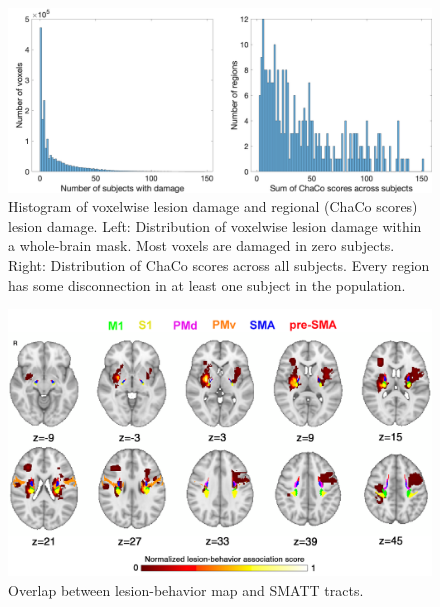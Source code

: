 \documentclass[10pt]{article}
\begin{document}
\begin{figure}[htp]
\centering
\includegraphics[width=1\linewidth]{figures/histogram_voxels_chaco.png}
\caption{Histogram of voxelwise lesion damage and regional (ChaCo scores) lesion damage. Left:  Distribution of voxelwise lesion damage within a whole-brain mask. Most voxels are damaged in zero subjects. Right: Distribution of ChaCo scores across all subjects. Every region has some disconnection in at least one subject in the population. }
\label{histogram_voxels_chaco}
\end{figure}


\begin{figure}[htp]
\centering
\includegraphics[width=1\linewidth]{figures/lbm_vs_smatt.png}
\caption{Overlap between lesion-behavior map and SMATT tracts.}
\label{lbm_vs_smatt}
\end{figure}
\end{document}
